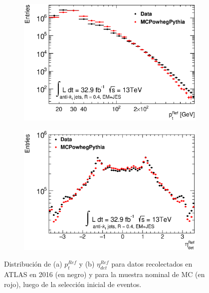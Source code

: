 \begin{figure}[ht]
    \centering
    \begin{subfigure}[b]{0.495\textwidth}
        \centering
        \includegraphics[width=\textwidth]{images/Final_LeadRefPt}
        \caption{ }
        \label{fig:JetptDist}
    \end{subfigure}
    \hfill
    \begin{subfigure}[b]{0.495\textwidth}
        \centering
        \includegraphics[width=\textwidth]{images/Final_RefLeadEta}
        \caption{}
        \label{fig:JetEtaDist}
    \end{subfigure}
    \caption{ Distribución de (a) $p_t^{Ref}$ y (b) $\eta_{det}^{Ref}$ para datos recolectados en ATLAS en 2016 (en negro) y para la muestra nominal de MC (en rojo), luego de la selección inicial de eventos.}
    \label{fig:JetDistro}
\end{figure}

